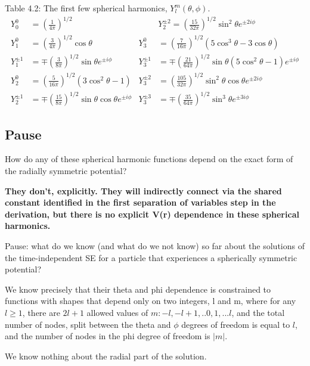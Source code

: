 \documentclass{article}
\begin{document}
Table 4.2: The first few spherical harmonics, $Y_{l}^{m}(\theta, \phi)$.
$$
\begin{aligned}
Y_{0}^{0} &=\left(\frac{1}{4 \pi}\right)^{1 / 2} & & Y_{2}^{\pm 2}=\left(\frac{15}{32 \pi}\right)^{1 / 2} \sin ^{2} \theta e^{\pm 2 i \phi} \\
\hline
Y_{1}^{0} &=\left(\frac{3}{4 \pi}\right)^{1 / 2} \cos \theta & Y_{3}^{0} &=\left(\frac{7}{16 \pi}\right)^{1 / 2}\left(5 \cos ^{3} \theta-3 \cos \theta\right) \\
\hline
Y_{1}^{\pm 1} &=\mp\left(\frac{3}{8 \pi}\right)^{1 / 2} \sin \theta e^{\pm i \phi} & Y_{3}^{\pm 1} &=\mp\left(\frac{21}{64 \pi}\right)^{1 / 2} \sin \theta\left(5 \cos ^{2} \theta-1\right) e^{\pm i \phi} \\
\hline
Y_{2}^{0} &=\left(\frac{5}{16 \pi}\right)^{1 / 2}\left(3 \cos ^{2} \theta-1\right) & Y_{3}^{\pm 2} &=\left(\frac{105}{32 \pi}\right)^{1 / 2} \sin ^{2} \theta \cos \theta e^{\pm 2 i \phi} \\
\hline
Y_{2}^{\pm 1} &=\mp\left(\frac{15}{8 \pi}\right)^{1 / 2} \sin \theta \cos \theta e^{\pm i \phi} & Y_{3}^{\pm 3} &=\mp\left(\frac{35}{64 \pi}\right)^{1 / 2} \sin ^{3} \theta e^{\pm 3 i \phi}
\end{aligned}
$$

\subsection{Pause}

How do any of these spherical harmonic functions depend on the exact form of the radially symmetric potential?

\textbf{They don’t, explicitly.  They will indirectly connect via the shared constant identified in the first separation of variables step in the derivation, but there is no explicit V(r) dependence in these spherical harmonics.
}

Pause: what do we know (and what do we not know) so far about the solutions of the time-independent SE for a particle that experiences a spherically symmetric potential?  

We know precisely that their theta and phi dependence is constrained to functions with shapes that depend only on two integers, l and m, where for any $l \geq 1$, there are $2l+1$ allowed values of $m: -l, -l+1,..0,1,...l$, and the total number of nodes, split between the theta and $\phi$ degrees of freedom is equal to $l$, and the number of nodes in the phi degree of freedom is $|m|$.

We know nothing about the radial part of the solution.
\end{document}
